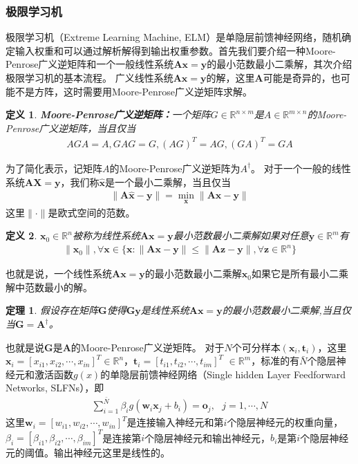 \documentclass[supercite]{HustGraduPaper}
\newtheorem{theorem}{定理}[section]  %
\newtheorem{definition}{定义}[section]
\begin{document}
\begin{sloppypar}
  \subsubsection{极限学习机}
  极限学习机（Extreme Learning Machine, ELM）是单隐层前馈神经网络，随机确定输入权重和可以通过解析解得到输出权重参数\cite{1380068}。首先我们要介绍一种Moore-Penrose广义逆矩阵和一个一般线性系统$\bm{Ax}=\bm{y}$的最小范数最小二乘解，其次介绍极限学习机的基本流程。
  广义线性系统$\bm{Ax}=\bm{y}$的解，这里$\bm{A}$可能是奇异的，也可能不是方阵，这时需要用Moore-Penrose广义逆矩阵求解。
  \begin{definition}
  \textbf{Moore-Penrose广义逆矩阵：}一个矩阵$G\in\mathbb{R}^{n\times m}$是$A\in\mathbb{R}^{m\times n}$的Moore-Penrose广义逆矩阵，当且仅当\begin{gather}
    AGA=A,GAG=G,(AG)^T=AG,(GA)^T=GA
  \end{gather}
  \end{definition}
  为了简化表示，记矩阵$A$的Moore-Penrose广义逆矩阵为$A^{\dag}$。
  对于一个一般的线性系统$\bm{AX}=\bm{y}$，我们称$\hat{\bm{x}}$是一个最小二乘解，当且仅当\begin{gather}
     \lVert \bm{A\hat{x}}-\bm{y} \rVert=\min\limits_{\bm{x}}\lVert \bm{Ax-y} \rVert
  \end{gather}
  这里$\lVert\cdot\rVert$是欧式空间的范数。
  \begin{definition}
  $\bm{x}_0\in\mathbb{R}^n$被称为线性系统$\bm{Ax=y}$最小范数最小二乘解如果对任意$\bm{y}\in\mathbb{R}^m$有\begin{gather}
   \lVert \bm{x}_0 \rVert,\forall \bm{x}\in\{ \bm{x}:\lVert \bm{Ax-y} \rVert\leq\lVert \bm{Az-y} \rVert,\forall\bm{z}\in\mathbb{R}^n \}
  \end{gather}
  \end{definition}
  也就是说，一个线性系统$\bm{Ax=y}$的最小范数最小二乘解$\bm{x}_0$如果它是所有最小二乘解中范数最小的解。
  \begin{theorem}
   假设存在矩阵$\bm{G}$使得$\bm{Gy}$是线性系统$\bm{Ax=y}$的最小范数最小二乘解,当且仅当$\bm{G}=\bm{A}^{\dag}$。
  \end{theorem}
  也就是说$\bm{G}$是$\bm{A}$的Moore-Penrose广义逆矩阵。
  对于$N$个可分样本$(\bm{x}_i,\bm{t}_i)$，这里$\bm{x}_i=[x_{i1},x_{i2},\cdots,x_{in}]^T\in\mathbb{R}^n$，$\bm{t}_i=[t_{i1},t_{i2},\cdots,t_{im}]^T$ $\in\mathbb{R}^m$，标准的有$\bar{N}$个隐层神经元和激活函数$g(x)$的单隐层前馈神经网络（Single hidden Layer Feedforward Networks, SLFNs），即\begin{gather}
    \sum\limits^{\bar{N}}_{i=1}\beta_ig(\bm{w}_i\bm{x}_j+b_i)=\bm{o}_j,\text{  }j=1,\cdots,N
  \end{gather}
  这里$\bm{w}_i=[w_{i1},w_{i2},\cdots,w_{in}]^T$是连接输入神经元和第$i$个隐层神经元的权重向量，$\beta_i=[\beta_{i1},\beta_{i2},\cdots,\beta_{im}]^T$是连接第$i$个隐层神经元和输出神经元，$b_i$是第$i$个隐层神经元的阈值。输出神经元这里是线性的。


\end{sloppypar}
\end{document}
